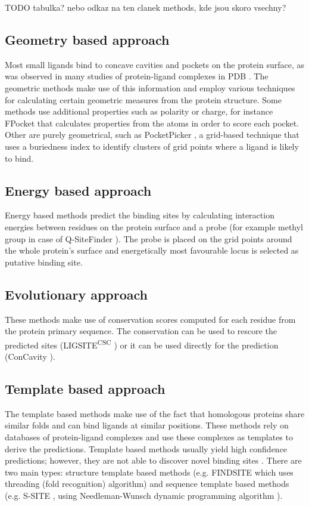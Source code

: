 TODO tabulka? nebo odkaz na ten clanek methods, kde jsou skoro vsechny?

\subsection{Geometry based approach}
Most small ligands bind to concave cavities and pockets on the protein surface, as was observed in many studies of protein-ligand complexes in PDB \cite{methods}. The geometric methods make use of this information and employ various techniques for calculating certain geometric measures from the protein structure. Some methods use additional properties such as polarity or charge, for instance FPocket \cite{fpocket} that calculates properties from the atoms in order to score each pocket. Other are purely geometrical, such as PocketPicker \cite{pocketpicker}, a grid-based technique that uses a buriedness index to identify clusters of grid points where a ligand is likely to bind.

\subsection{Energy based approach}
Energy based methods predict the binding sites by calculating interaction energies between residues on the protein surface and a probe (for example methyl group in case of Q-SiteFinder \cite{qsitefinder}). The probe is placed on the grid points around the whole protein's surface and energetically most favourable locus is selected as putative binding site.

\subsection{Evolutionary approach}
These methods make use of conservation scores computed for each residue from the protein primary sequence. The conservation can be used to rescore the predicted sites (LIGSITE\textsuperscript{CSC} \cite{ligsitecsc}) or it can be used directly for the prediction (ConCavity \cite{concavity}).

\subsection{Template based approach}
The template based methods make use of the fact that homologous proteins share similar folds and can bind ligands at similar positions. These methods rely on databases of protein-ligand complexes and use these complexes as templates to derive the predictions. Template based methods usually yield high confidence predictions; however, they are not able to discover novel binding sites \cite{p2rank1}. There are two main types: structure template based methods (e.g. FINDSITE \cite{findsite} which uses threading (fold recognition) algorithm) and sequence template based methods (e.g. S-SITE \cite{ssite}, using Needleman-Wunsch dynamic programming algorithm \cite{needleman}).

